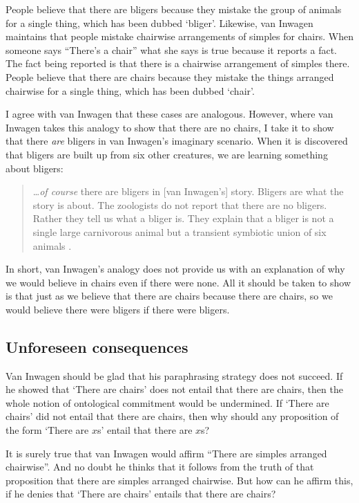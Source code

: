 \documentclass[12pt,twoside]{reedfancy}
\begin{document}
\begin{spacing}{1.25}
People believe that there are bligers because they mistake the group
of animals for a single thing, which has been dubbed `bliger'.
Likewise, van Inwagen maintains that people mistake chairwise
arrangements of simples for chairs.  When someone says ``There's a
chair'' what she says is true because it reports a fact.  The fact
being reported is that there is a chairwise arrangement of simples
there.  People believe that there are chairs because they mistake the
things arranged chairwise for a single thing, which has been dubbed
`chair'.

I agree with van Inwagen that these cases are analogous.  However,
where van Inwagen takes this analogy to show that there are no chairs,
I take it to show that there {\em are} bligers in van Inwagen's
imaginary scenario.  When it is discovered that bligers are built up
from six other creatures, we are learning something about bligers:

\begin{quote}
\ldots {\em of course} there are bligers in [van Inwagen's] story.
Bligers are what the story is about.  The zoologists do not report
that there are no bligers.  Rather they tell us what a bliger is.
They explain that a bliger is not a single large carnivorous animal
but a transient symbiotic union of six animals
\citep[704]{rosenberg1993}.
\end{quote}

In short, van Inwagen's analogy does not provide us with an
explanation of why we would believe in chairs even if there were
none.  All it should be taken to show is that just as we believe that
there are chairs because there are chairs, so we would believe there
were bligers if there were bligers.

\subsection{Unforeseen consequences}
\label{backfire}
Van Inwagen should be glad that his paraphrasing strategy does not
succeed.  If he showed that `There are chairs' does not entail that
there are chairs, then the whole notion of ontological commitment
would be undermined.  If `There are chairs' did not entail that there
are chairs, then why should any proposition of the form `There are
$x$s' entail that there are $x$s?

It is surely true that van Inwagen would affirm ``There are simples
arranged chairwise''.  And no doubt he thinks that it follows from the
truth of that proposition that there are simples arranged chairwise.
But how can he affirm this, if he denies that `There are chairs'
entails that there are chairs?


\end{spacing}
\end{document}
